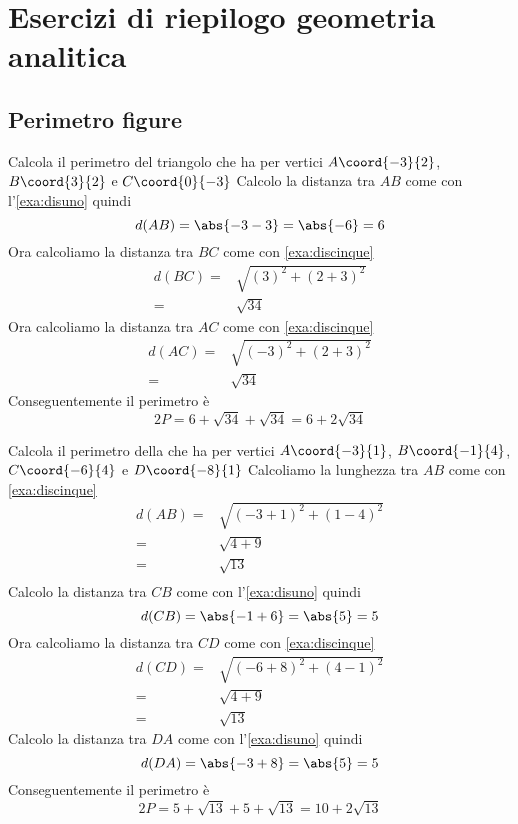 %	
\chapter{Esercizi di riepilogo geometria analitica}
\section{Perimetro figure}
\tcbstartrecording
\begin{exercise}
Calcola il perimetro del triangolo che ha per vertici $A\coord{-3}{2}$, $B\coord{3}{2}$ e $C\coord{0}{-3}$
\tcblower
Calcolo la distanza tra $AB$ come con l'\cref{exa:disuno} 
quindi \[d(AB)=\abs{-3-3}=\abs{-6}=6\] Ora calcoliamo la distanza tra $BC$ come con \cref{exa:discinque} 
\begin{align*}
d(BC)=&\sqrt{(3)^2+(2+3)^2}\\
=&\sqrt{34}
\end{align*}
Ora calcoliamo la distanza tra $AC$ come con \cref{exa:discinque} 
\begin{align*}
d(AC)=&\sqrt{(-3)^2+(2+3)^2}\\
=&\sqrt{34}
\end{align*}
Conseguentemente il perimetro è
\[2P=6+\sqrt{34}+\sqrt{34}=6+2\sqrt{34}\]
\begin{center}
	
	\label{fig:EsRieDistanza11}
\end{center}
\end{exercise}
\begin{exercise}
	Calcola il perimetro della che ha per vertici $A\coord{-3}{1}$, $B\coord{-1}{4}$, $C\coord{-6}{4}$ e  $D\coord{-8}{1}$
	\tcblower
	Calcoliamo la lunghezza tra $AB$ come con \cref{exa:discinque} 
	\begin{align*}
		d(AB)=&\sqrt{(-3+1)^2+(1-4)^2}\\
		=&\sqrt{4+9}\\
		=&\sqrt{13}\\
	\end{align*}
	Calcolo la distanza tra $CB$ come con l'\cref{exa:disuno} 
	quindi \[d(CB)=\abs{-1+6}=\abs{5}=5\]
	Ora calcoliamo la distanza tra $CD$ come con \cref{exa:discinque} 
	\begin{align*}
		d(CD)=&\sqrt{(-6+8)^2+(4-1)^2}\\
			=&\sqrt{4+9}\\
		=&\sqrt{13}
	\end{align*}
	Calcolo la distanza tra $DA$ come con l'\cref{exa:disuno} 
	quindi \[d(DA)=\abs{-3+8}=\abs{5}=5\]
	Conseguentemente il perimetro è
	\[2P=5+\sqrt{13}+5+\sqrt{13}=10+2\sqrt{13}\]
	\begin{center}
		
		\label{fig:EsRieDistanza12}
	\end{center}
\end{exercise}
